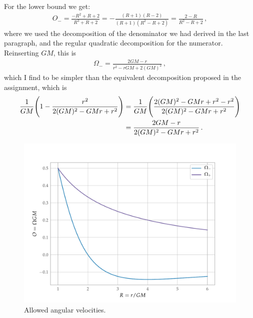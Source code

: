 \documentclass[main.tex]{subfiles}
\begin{document}
For the lower bound we get: 
%
\begin{align}
O_{- } = \frac{- R^2 + R + 2 }{R^3 + R + 2} 
= - \frac{(R+1) (R-2)}{(R+1) (R^2-R+2)} 
= \frac{2-R}{R^2-R+2}
\,,
\end{align}
%
where we used the decomposition of the denominator we had derived in the last paragraph, and the regular quadratic decomposition for the numerator. Reinserting \(GM\), this is 
%
\begin{align}
\Omega_{-} = \frac{2GM-r}{r^2- rGM +2 (GM)^2}
\,,
\end{align}
%
which I find to be simpler than the equivalent decomposition proposed in the assignment, which is 
%
\begin{subequations}
\begin{align}
\frac{1}{GM} \qty(1 - \frac{r^2}{2(GM)^2-GMr +r^2}) 
&= \frac{1}{GM} \qty(\frac{2(GM)^2-GMr +r^2 - r^2}{2(GM)^2-GMr +r^2})  \\
&= \frac{2GM - r}{2(GM)^2-GMr +r^2}
\,.
\end{align}
\end{subequations}
%
\begin{figure}[ht]
  \centering
  \includegraphics[width=\textwidth]{figures/allowed_velocities.pdf}
  \caption{Allowed angular velocities.}
  \label{fig:allowed-velocities}
\end{figure}
%
\end{document}
